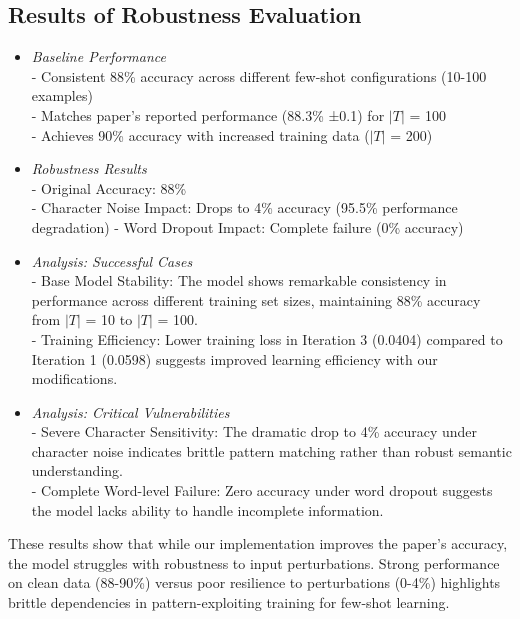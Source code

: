 \documentclass[11pt,a4paper]{article}
\begin{document}
\subsection{Results of Robustness Evaluation}
\begin{itemize}[topsep=0pt]
  \item \textit{Baseline Performance}\\ 
  - Consistent 88\% accuracy across different few-shot configurations (10-100 examples)\\
  - Matches paper's reported performance (88.3\% ±0.1) for $|T|$ = 100\\
  - Achieves 90\% accuracy with increased training data ($|T|$ = 200)
  \item \textit{Robustness Results}\\
  - Original Accuracy: 88\%\\
  - Character Noise Impact: Drops to 4\% accuracy (95.5\% performance degradation)
  - Word Dropout Impact: Complete failure (0\% accuracy)
  \item \textit{Analysis: Successful Cases}\\ 
  - Base Model Stability: The model shows remarkable consistency in performance across different training set sizes, maintaining 88\% accuracy from $|T|$ = 10 to $|T|$ = 100.\\
  - Training Efficiency: Lower training loss in Iteration 3 (0.0404) compared to Iteration 1 (0.0598) suggests improved learning efficiency with our modifications.
  \item \textit{Analysis: Critical Vulnerabilities}\\
  - Severe Character Sensitivity: The dramatic drop to 4\% accuracy under character noise indicates brittle pattern matching rather than robust semantic understanding.\\
  - Complete Word-level Failure: Zero accuracy under word dropout suggests the model lacks ability to handle incomplete information.
\end{itemize}
These results show that while our implementation improves the paper's accuracy, the model struggles with robustness to input perturbations. Strong performance on clean data (88-90\%) versus poor resilience to perturbations (0-4\%) highlights brittle dependencies in pattern-exploiting training for few-shot learning.
\end{document}
